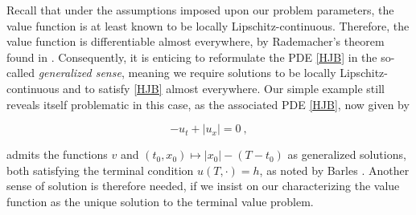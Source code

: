 	Recall that under the assumptions imposed upon our problem parameters, the value function is at least known to be locally Lipschitz-continuous. Therefore, the value function is differentiable almost everywhere, by Rademacher's theorem found in \cite{evans}. Consequently, it is enticing to reformulate the PDE \eqref{HJB} in the so-called \emph{generalized sense}, meaning we require solutions to be locally Lipschitz-continuous and to satisfy \eqref{HJB} almost everywhere. Our simple example still reveals itself problematic in this case, as the associated PDE \eqref{HJB}, now given by
	
	\begin{equation*}
		-u_t + \lvert u_x \rvert = 0 \ ,
	\end{equation*}
	
	admits the functions $ v $ and $ (t_0, x_0) \mapsto \lvert x_0 \rvert - (T - t_0) $ as generalized solutions, both satisfying the terminal condition $ u(T, \cdot) = h $, as noted by Barles \cite{barles}. Another sense of solution is therefore needed, if we insist on our characterizing the value function as the unique solution to the terminal value problem.